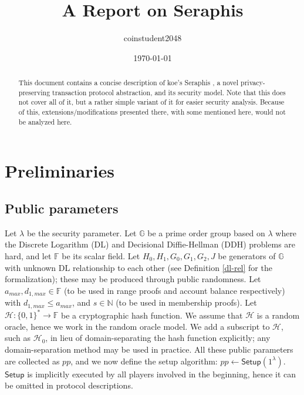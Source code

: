 \documentclass{article}
\title{A Report on Seraphis}
\author{coinstudent2048}
\date{\today}
\theoremstyle{plain}
\theoremstyle{remark}
\begin{document}
\maketitle

\begin{abstract}
This document contains a concise description of koe's Seraphis \cite{seraphis}, a novel privacy-preserving transaction protocol abstraction, and its security model. Note that this does not cover all of it, but a rather simple variant of it for easier security analysis. Because of this, extensions/modifications presented there, with some mentioned here, would not be analyzed here.
\end{abstract}


\section{Preliminaries}
\subsection{Public parameters}
Let $\lambda$ be the security parameter. Let $\mathbb{G}$ be a prime order group based on $\lambda$ where the Discrete Logarithm (DL) and Decisional Diffie-Hellman (DDH) problems are hard, and let $\mathbb{F}$ be its scalar field. Let $H_0, H_1, G_0, G_1, G_2, J$ be generators of $\mathbb{G}$ with unknown DL relationship to each other (see Definition \ref{dl-rel} for the formalization); these may be produced through public randomness. Let $a_{max}, d_{1,max}\in\mathbb{F}$ (to be used in range proofs and account balance respectively) with $d_{1,max} \le a_{max}$, and $s\in\mathbb{N}$ (to be used in membership proofs). Let $\mathcal{H}:\{0,1\}^*\rightarrow\mathbb{F}$ be a cryptographic hash function. We assume that $\mathcal{H}$ is a random oracle, hence we work in the random oracle model. We add a subscript to $\mathcal{H}$, such as $\mathcal{H}_0$, in lieu of domain-separating the hash function explicitly; any domain-separation method may be used in practice. All these public parameters are collected as $pp$, and we now define the setup algorithm: $pp\leftarrow\textsf{Setup}(1^{\lambda})$. $\textsf{Setup}$ is implicitly executed by all players involved in the beginning, hence it can be omitted in protocol descriptions.
\end{document}
